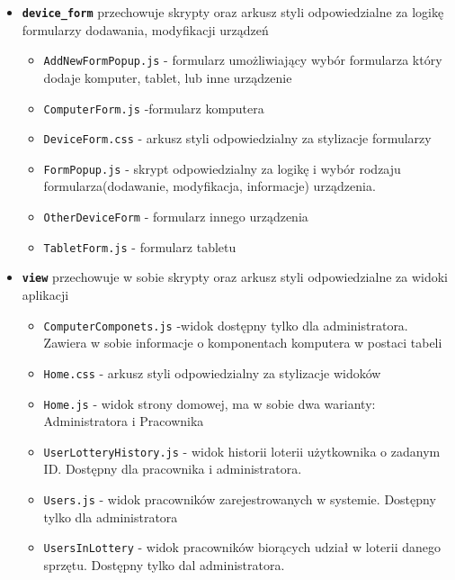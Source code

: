 \begin {itemize}
	\begin{itemize}
	\item \texttt{CpuForm.js} - formularz procesora
	\item \texttt{RamForm.js} - formularz pamięci RAM
	\item \texttt{StorageForm.js} - formularz pamięcu dyskowej
	\end{itemize}
\item \texttt{\textbf{device\_form}} przechowuje skrypty oraz arkusz styli odpowiedzialne za logikę formularzy dodawania, modyfikacji urządzeń
	\begin{itemize}
	\item \texttt{AddNewFormPopup.js} - formularz umożliwiający wybór formularza który dodaje komputer, tablet, lub inne urządzenie
	\item \texttt{ComputerForm.js} -formularz komputera
	\item \texttt{DeviceForm.css} - arkusz styli odpowiedzialny za stylizacje formularzy
	\item \texttt{FormPopup.js} - skrypt odpowiedzialny za logikę i wybór rodzaju formularza(dodawanie, modyfikacja, informacje) urządzenia.
	\item \texttt{OtherDeviceForm} - formularz innego urządzenia
	\item \texttt{TabletForm.js} - formularz tabletu
	\end{itemize}
\item \texttt{\textbf{view}} przechowuje w sobie skrypty oraz arkusz styli odpowiedzialne za widoki aplikacji
	\begin{itemize}
	\item \texttt{ComputerComponets.js} -widok dostępny tylko dla administratora. Zawiera w sobie informacje o komponentach komputera w postaci tabeli
	\item \texttt{Home.css} - arkusz styli odpowiedzialny za stylizacje widoków
	\item \texttt{Home.js} - widok strony domowej, ma w sobie dwa warianty: Administratora i Pracownika
	\item \texttt{UserLotteryHistory.js} - widok historii loterii użytkownika o zadanym ID. Dostępny dla pracownika i administratora.
	\item \texttt{Users.js} - widok pracowników zarejestrowanych w systemie. Dostępny tylko dla administratora
	\item \texttt{UsersInLottery} - widok pracowników biorących udział w loterii danego sprzętu. Dostępny tylko dal administratora.
	\end{itemize}
\end{itemize}

